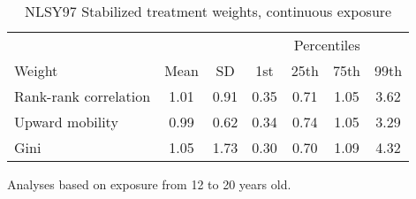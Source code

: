\begin{table}[htp]
\centering
\footnotesize
\setlength{\tabcolsep}{10pt}
\renewcommand{\arraystretch}{1}
\begin{threeparttable}
\centering
\caption{NLSY97 Stabilized treatment weights, continuous exposure} 
\label{tab:nlsy97_ipt_weigths_z}
\begin{tabular}{lcccccc}
  \hline
\multicolumn{3}{c}{} & \multicolumn{4}{c}{Percentiles} \\ 
 \cmidrule{4-7} 
Weight & Mean & SD & 1st & 25th & 75th & 99th \\ 
  \hline
Rank-rank correlation & 1.01 & 0.91 & 0.35 & 0.71 & 1.05 & 3.62 \\ 
  Upward mobility & 0.99 & 0.62 & 0.34 & 0.74 & 1.05 & 3.29 \\ 
  Gini & 1.05 & 1.73 & 0.30 & 0.70 & 1.09 & 4.32 \\ 
   \hline
\end{tabular}
\begin{tablenotes}
\footnotesize
\item Analyses based on exposure from 12 to 20 years old. 
\end{tablenotes}
\end{threeparttable}
\end{table}
